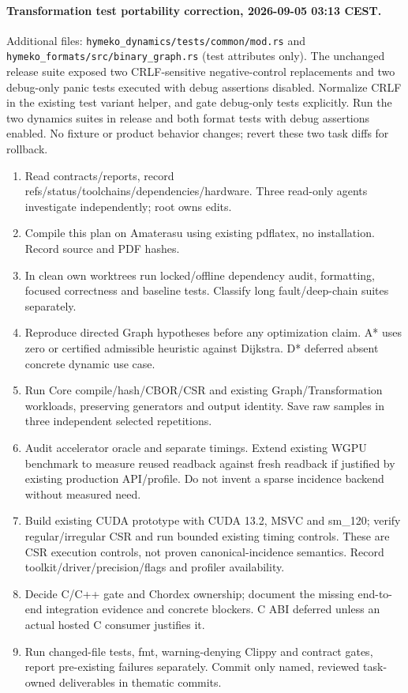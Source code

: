 \documentclass[10pt,a4paper]{article}
\begin{document}
\paragraph{Transformation test portability correction, 2026-09-05 03:13 CEST.}
Additional files: \texttt{hymeko\_dynamics/tests/common/mod.rs} and
\texttt{hymeko\_formats/src/binary\_graph.rs} (test attributes only).
The unchanged release suite exposed two CRLF-sensitive negative-control replacements
and two debug-only panic tests executed with debug assertions disabled. Normalize CRLF
in the existing test variant helper, and gate debug-only tests explicitly. Run the
two dynamics suites in release and both format tests with debug assertions enabled.
No fixture or product behavior changes; revert these two task diffs for rollback.
\begin{enumerate}
\item Read contracts/reports, record refs/status/toolchains/dependencies/hardware. Three read-only agents investigate independently; root owns edits.
\item Compile this plan on Amaterasu using existing pdflatex, no installation. Record source and PDF hashes.
\item In clean own worktrees run locked/offline dependency audit, formatting, focused correctness and baseline tests. Classify long fault/deep-chain suites separately.
\item Reproduce directed Graph hypotheses before any optimization claim. A* uses zero or certified admissible heuristic against Dijkstra. D* deferred absent concrete dynamic use case.
\item Run Core compile/hash/CBOR/CSR and existing Graph/Transformation workloads, preserving generators and output identity. Save raw samples in three independent selected repetitions.
\item Audit accelerator oracle and separate timings. Extend existing WGPU benchmark to measure reused readback against fresh readback if justified by existing production API/profile. Do not invent a sparse incidence backend without measured need.
\item Build existing CUDA prototype with CUDA 13.2, MSVC and sm\_120; verify regular/irregular CSR and run bounded existing timing controls. These are CSR execution controls, not proven canonical-incidence semantics. Record toolkit/driver/precision/flags and profiler availability.
\item Decide C/C++ gate and Chordex ownership; document the missing end-to-end integration evidence and concrete blockers. C ABI deferred unless an actual hosted C consumer justifies it.
\item Run changed-file tests, fmt, warning-denying Clippy and contract gates, report pre-existing failures separately. Commit only named, reviewed task-owned deliverables in thematic commits.
\end{enumerate}
\end{document}
